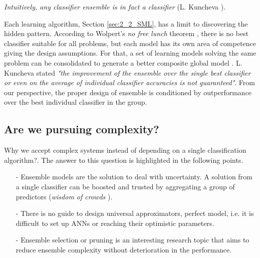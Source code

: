 \textit{Intuitively, any classifier ensemble is in fact a classifier} (L. Kuncheva \cite{kuncheva2014}).












Each learning algorithm, Section \ref{sec:2_2_SML}, has a limit to discovering the hidden pattern. According to Wolpert's \emph{no free lunch} theorem \citep{wolpert2002}, there is no best classifier suitable for all problems, but each model has its own area of competence giving the design assumptions. For that, a set of learning models solving the same problem can be consolidated to generate a better composite global model \cite{ksieniewicz2018}. L. Kuncheva \cite{kuncheva2014} stated \textit{"the improvement of the ensemble over the single best classifier or even on the average of individual classifier accuracies is not guaranteed"}. From our perspective, the proper design of ensemble is conditioned by outperformance over the best individual classifier in the group.  



\subsection{Are we pursuing complexity?}
Why we accept complex systems instead of depending on a single classification algorithm?. The answer to this question is highlighted in the following points.
\begin{itemize}[nosep]
    \item[-] Ensemble models are the solution to deal with uncertainty. A solution from a single classifier can be boosted and trusted by aggregating a group of predictors (\textit{wisdom of crowds} \cite{rokach2010}).
    \item[-] There is no guide to design universal approximators, perfect model, i.e. it is difficult to set up ANNs or reaching their optimistic parameters.

    \item[-] Ensemble selection or pruning is an interesting research topic that aims to reduce ensemble complexity without deterioration in the performance.
\end{itemize}

